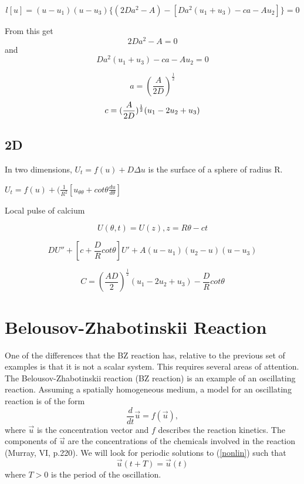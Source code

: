 \documentclass[]{article}
\numberwithin{equation}{section}		%
\let\[\equation
\let\]\endequation
\begin{document}
    $$l [u ]=(u-u_{1} ) (u-u_{3} ) \{ (2Da^{2}-A )- [Da^{2} (u_{1}+u_{3} )-ca-Au_{2} ] \}=0$$

    From this get $$2Da^{2}-A=0$$ and  $$Da^{2} (u_{1}+u_{3})-ca-Au_{2} =0$$

   $$a =  (\frac{A}{2D} )^{\frac{1}{2}}$$
   $$c=(\frac{A}{2D} )^{\frac{1}{2}}(u_{1}-2u_{2}+u_{3} )\\$$




\subsection{2D}
   In two dimensions, $U_{t}=f(u)+D\Delta u$ is the surface of  a sphere of radius R.

   \begin{center}
   		$U_{t} = f(u)+(\frac{1}{R^{2}} [u_{\theta\theta}+cot\theta\frac{du}{d\theta}]$
   \end{center}

   Local pulse of calcium

  $$ U (\theta,t )=U (z ),  z=R\theta-ct$$

  $$ DU''+ [c+\frac{D}{R}cot\theta ]U'+A (u-u_{1} ) (u_{2}-u ) (u-u_{3} )$$

   $$C =  (\frac{AD}{2} )^{\frac{1}{2}} (u_{1}-2u_{2}+u_{3} )-\frac{D}{R}cot\theta$$
	\[
\]

\newpage
\section{Belousov-Zhabotinskii Reaction}
One of the differences that the BZ reaction has, relative to the previous set of examples is that it is not a scalar system. This requires several areas of attention.
The Belousov-Zhabotinskii reaction (BZ reaction) is an example of an oscillating reaction. Assuming a spatially homogeneous medium, a model for an oscillating reaction is of the form 
\begin{equation}\label{nonlin}
\frac{d}{dt} \vec{u} = f(\vec{u}),
\end{equation}
where $\vec{u}$ is the concentration vector and $f$ describes the reaction kinetics. The components of $\vec{u}$ are the concentrations of the chemicals involved in the reaction (Murray, VI, p.220). We will look for periodic solutions to (\ref{nonlin}) such that
\begin{equation}
\vec{u}(t+T)=\vec{u}(t)
\end{equation}
where $T>0$ is the period of the oscillation.
\end{document}
